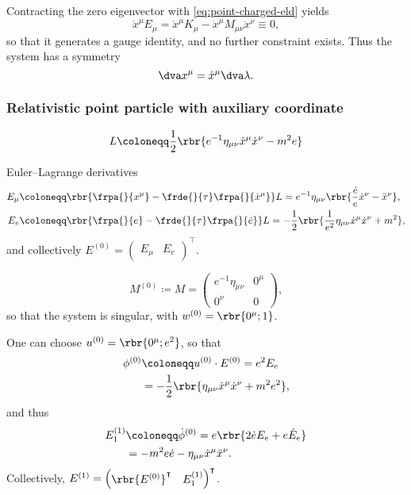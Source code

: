 \documentclass[a4paper,11pt]{article}
\begin{document}
Contracting the zero eigenvector with \cref{eq:point-charged-eld} yields
\begin{equation}
\dot{x}^\mu E_\mu = \dot{x}^\mu K_\mu - \dot{x}^\mu M_{\mu\nu} \ddot{x}^\nu
\equiv 0,
\end{equation}
so that it generates a gauge identity, and no further constraint exists. Thus 
the system has a symmetry
\begin{equation}
\dva x^\mu = \dot{x}^\mu \dva \lambda.
\end{equation}

\subsubsection*{Relativistic point particle with auxiliary coordinate}

\cite[sec.\ 2.1]{Blumenhagen2013}
\begin{equation}
L \coloneqq \frac{1}{2} \rbr{e^{-1}\eta_{\mu\nu}\dot{x}^\mu \dot{x}^\nu - m^2 e}
\label{eq:point-aux-lagrangian}
\end{equation}

Euler--Lagrange derivatives
\begin{align}
E_\mu &\coloneqq \rbr{\frpa{}{x^\mu}-\frde{}{\tau}\frpa{}{\dot{x}^\mu}}L 
= e^{-1}\eta_{\mu\nu} \rbr{\frac{\dot{e}}{e}\dot{x}^\nu - \ddot{x}^\nu}, \\
E_e &\coloneqq \rbr{\frpa{}{e}-\frde{}{\tau}\frpa{}{\dot{e}}}L
= -\frac{1}{2}\rbr{\frac{1}{e^2}\eta_{\mu\nu}\dot{x}^\mu\dot{x}^\nu + m^2},
\end{align}
and collectively $E^{(0)} = \begin{pmatrix} E_\mu & E_e 
\end{pmatrix}^\intercal$.

\begin{equation}
M^{(0)} \coloneqq M =
\begin{pmatrix}
e^{-1}\eta_{\mu\nu} & 0^\mu \\
0^\nu & 0
\end{pmatrix},
\end{equation}
so that the system is singular, with $w^{(0)} = \rbr{0^\mu; 1}$.

One can choose $u^{(0)} = \rbr{0^\mu; e^2}$, so that
\begin{align}
\phi^{(0)} &\coloneqq u^{(0)}\cdot E^{(0)} = e^2 E_e \\
&= -\frac{1}{2}\rbr{\eta_{\mu\nu}\dot{x}^\mu\dot{x}^\nu + m^2 e^2},
\end{align}
and thus
\begin{align}
E^{(1)}_1 &\coloneqq \dot{\phi}^{(0)} = e\rbr{2\dot{e} E_e + e\dot{E}_e} \\
&= - m^2 e\dot{e}-\eta_{\mu\nu}\dot{x}^\mu\ddot{x}^\nu.
\end{align}
Collectively, $E^{(1)} = \begin{pmatrix} \rbr{E^{(0)}}^\intercal & E^{(1)}_1
\end{pmatrix}^\intercal$.
\end{document}
